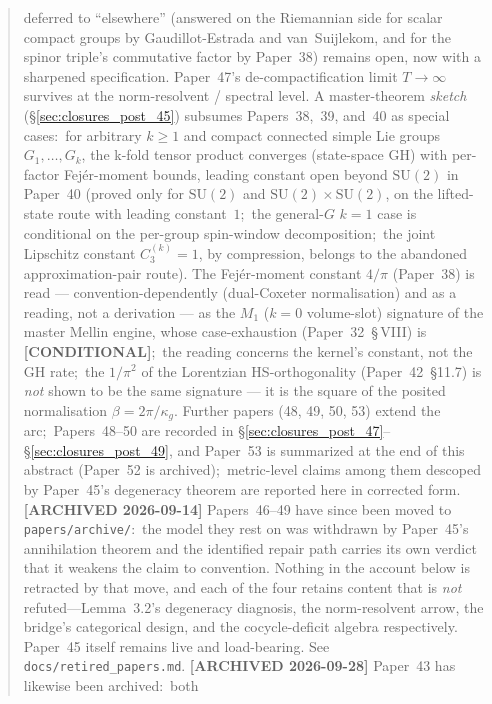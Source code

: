 \documentclass[11pt,a4paper]{article}
\theoremstyle{plain}
\theoremstyle{definition}
\newcommand{\SU}{\mathrm{SU}}
\newcommand{\gvc}[2]{#2}
\begin{document}
\begin{abstract}
deferred to ``elsewhere'' (answered on the Riemannian side for scalar compact groups by
Gaudillot-Estrada and van~Suijlekom, and for the spinor triple's
commutative factor by Paper~38) remains open, now with a sharpened specification.  Paper~47's
de-compactification limit $T \to \infty$ survives at the
norm-resolvent / spectral level.  A
master-theorem \emph{sketch} (\S\ref{sec:closures_post_45}) subsumes
Papers~38,~39, and~40 as special cases:\ \gvc{p40-general-g-conditional}{for arbitrary $k \ge 1$ and
compact connected simple Lie groups $G_{1}, \ldots, G_{k}$, the
k-fold tensor product converges (state-space GH) with per-factor Fej\'er-moment
bounds, leading constant open beyond $\SU(2)$ in Paper~40 (proved only for $\SU(2)$ and
$\SU(2)\times\SU(2)$, on the lifted-state route with leading
constant~$1$;\ the general-$G$ $k = 1$ case is conditional on the
per-group spin-window decomposition;\ the joint Lipschitz constant
$C_3^{(k)} = 1$, by compression, belongs to the abandoned
approximation-pair route)}.  \gvc{m1-gh-rate-reading}{The Fej\'er-moment constant $4/\pi$ (Paper~38) is read --- convention-dependently
(dual-Coxeter normalisation) and as a reading, not a derivation --- as the
$M_{1}$ ($k = 0$ volume-slot) signature of the master Mellin engine, whose
case-exhaustion (Paper~32~\S\,VIII) is \textbf{[CONDITIONAL]}};\ the reading
concerns the kernel's constant, not the GH rate;\ the $1/\pi^{2}$ of the
Lorentzian HS-orthogonality (Paper~42~\S 11.7) is \emph{not} shown to be
the same signature --- it is the square of the posited normalisation
$\beta = 2\pi/\kappa_g$.  Further papers (48, 49, 50, 53) extend the arc;\ Papers~48--50 are recorded in
\S\ref{sec:closures_post_47}--\S\ref{sec:closures_post_49}, and Paper~53 is summarized at the end of this abstract (Paper~52 is archived);\ metric-level
claims among them descoped by Paper~45's degeneracy theorem are
reported here in corrected form.  \textbf{[ARCHIVED 2026-09-14]}
Papers~46--49 have since been moved to \texttt{papers/archive/}:\ the model
they rest on was withdrawn by Paper~45's annihilation theorem and the
identified repair path carries its own verdict that it weakens the claim to
convention.  Nothing in the account below is retracted by that move, and each
of the four retains content that is \emph{not} refuted---Lemma~3.2's degeneracy
diagnosis, the norm-resolvent arrow, the bridge's categorical design, and the
cocycle-deficit algebra respectively.  Paper~45 itself remains live and
load-bearing.  See \texttt{docs/retired\_papers.md}.
\textbf{[ARCHIVED 2026-09-28]} Paper~43 has likewise been archived:\ both

\end{abstract}
\end{document}
